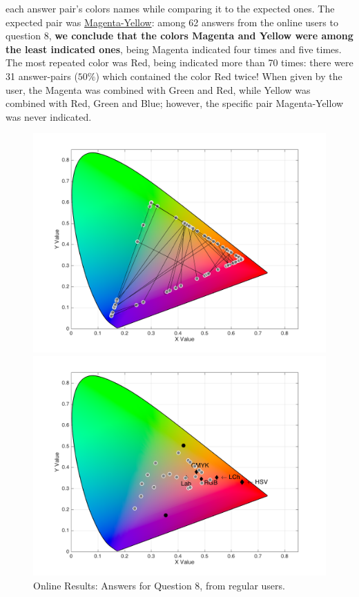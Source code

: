 each answer pair's colors names while comparing it to the expected ones. The expected pair was \ul{Magenta-Yellow}: among
62 answers from the online users to question 8, \textbf{we conclude that the colors Magenta and Yellow were among the least
indicated ones}, being Magenta indicated four times and five times. The most repeated color was Red, being indicated more than
70 times: there were 31 answer-pairs ($50\%$) which contained the color Red twice! When given by the user, the Magenta was combined
with Green and Red, while Yellow was combined with Red, Green and Blue; however, the specific pair Magenta-Yellow was never indicated.
%
\begin{figure}[!htbp]
  \centering
  \begin{minipage}{0.48\textwidth}
    \centering
    \includegraphics[width=\textwidth]{images/results/8_online_regularUsers.png}
    \caption[Online Results: Answers for Question 8, from regular users.]{Online Results: Answers for Question 8, from regular users.}
    \label{fig:redblend_1}
  \end{minipage}\hfill
  \begin{minipage}{0.48\textwidth}
    \centering
    \includegraphics[width=\textwidth]{images/results/25_online_regularUsers.png}

\end{minipage}
\end{figure}
